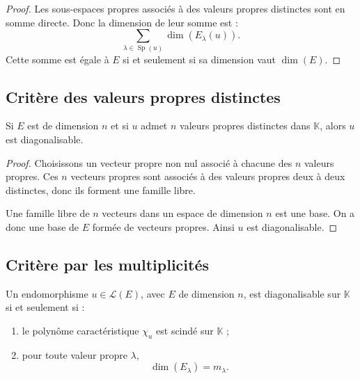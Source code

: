 \documentclass[11pt,a4paper]{article}
\newcommand{\K}{\mathbb K}
\newcommand{\Lcal}{\mathcal L}
\newcommand{\Sp}{\operatorname{Sp}}
\begin{document}
\begin{proof}
Les sous-espaces propres associés à des valeurs propres distinctes sont en somme directe.  
Donc la dimension de leur somme est :
\[
\sum_{\lambda\in\Sp(u)}\dim(E_\lambda(u)).
\]
Cette somme est égale à \(E\) si et seulement si sa dimension vaut \(\dim(E)\).
\end{proof}

\subsection{Critère des valeurs propres distinctes}

\begin{theorembox}
Si \(E\) est de dimension \(n\) et si \(u\) admet \(n\) valeurs propres distinctes dans \(\K\), alors \(u\) est diagonalisable.
\end{theorembox}

\begin{proof}
Choisissons un vecteur propre non nul associé à chacune des \(n\) valeurs propres.  
Ces \(n\) vecteurs propres sont associés à des valeurs propres deux à deux distinctes, donc ils forment une famille libre.

Une famille libre de \(n\) vecteurs dans un espace de dimension \(n\) est une base.  
On a donc une base de \(E\) formée de vecteurs propres.  
Ainsi \(u\) est diagonalisable.
\end{proof}

\subsection{Critère par les multiplicités}

\begin{theorembox}
Un endomorphisme \(u\in\Lcal(E)\), avec \(E\) de dimension \(n\), est diagonalisable sur \(\K\) si et seulement si :
\begin{enumerate}
    \item le polynôme caractéristique \(\chi_u\) est scindé sur \(\K\) ;
    \item pour toute valeur propre \(\lambda\),
    \[
    \dim(E_\lambda)=m_\lambda.
    \]
\end{enumerate}
\end{theorembox}
\end{document}
